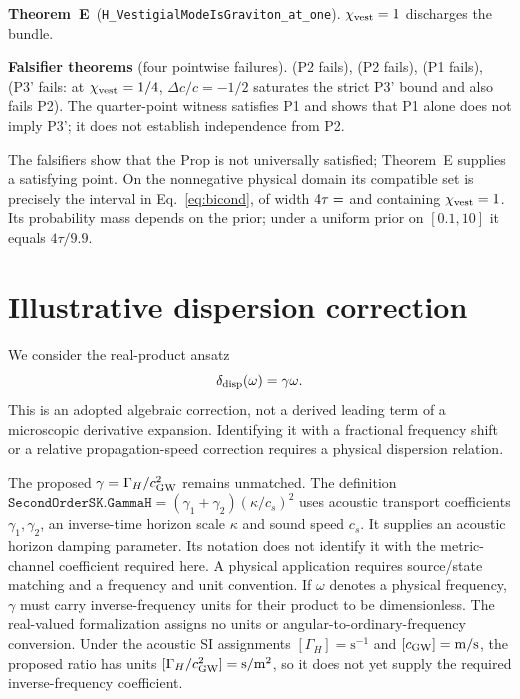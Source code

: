 \documentclass[aps,prd,twocolumn,showpacs,superscriptaddress,nofootinbib]{revtex4-2}
\newcommand{\cGW}{c_{\rm GW}}
\newcommand{\chivest}{\chi_{\rm vest}}
\newcommand{\GammaH}{\Gamma_{H}}
\newcommand{\dccap}{\Delta c/c}
\begin{document}
\textbf{Theorem~E}~(\verb|H_VestigialModeIsGraviton_at_one|).
$\chivest = 1$ discharges the bundle.

\textbf{Falsifier theorems} (four pointwise failures).
 (P2 fails),
 (P2 fails),
 (P1 fails),
 (P3' fails: at
$\chivest = 1/4$, $\dccap=-1/2$ saturates the strict P3' bound
and also fails P2). The quarter-point witness satisfies P1 and
shows that P1 alone does not imply P3'; it does not establish
independence from P2.

The falsifiers show that the Prop is not universally satisfied;
Theorem~E supplies a satisfying point. On the nonnegative physical
domain its compatible set is precisely the interval in
Eq.~\eqref{eq:bicond}, of width $4\tau=\unskip$ and
containing $\chivest=1$. Its probability mass depends on the prior;
under a uniform prior on $[0.1,10]$ it equals $4\tau/9.9$.

\section{Illustrative dispersion correction}
\label{sec:dispersion}

We consider the real-product ansatz
\begin{equation}
\delta_{\rm disp}(\omega)=\gamma\omega .
\label{eq:dispersion}
\end{equation}
This is an adopted algebraic correction, not a derived leading term
of a microscopic derivative expansion. Identifying it with a fractional
frequency shift or a relative propagation-speed correction requires a
physical dispersion relation.

The proposed $\gamma=\GammaH/\cGW^2$ remains unmatched.
The definition
$\texttt{SecondOrderSK.GammaH}=(\gamma_1+\gamma_2)(\kappa/c_s)^2$
uses acoustic transport coefficients $\gamma_1,\gamma_2$, an
inverse-time horizon scale $\kappa$ and sound speed $c_s$. It supplies an acoustic
horizon damping parameter. Its notation does
not identify it with the metric-channel coefficient required here.
A physical application requires source/state matching and a frequency
and unit convention. If $\omega$ denotes a physical frequency,
$\gamma$ must carry inverse-frequency units for their product to be
dimensionless. The real-valued formalization assigns no units or
angular-to-ordinary-frequency conversion. Under the acoustic SI
assignments $[\GammaH]=\mathrm{s}^{-1}$ and
$[\cGW]=\mathrm{m/s}$, the proposed ratio has units
$[\GammaH/\cGW^2]=\mathrm{s/m^2}$, so it does not yet
supply the required inverse-frequency coefficient.
\end{document}
